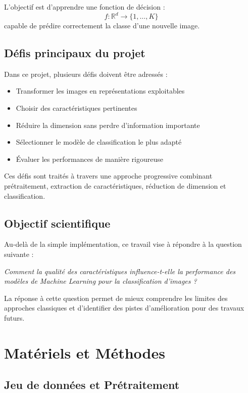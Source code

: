 \documentclass[12pt,a4paper]{article}
\begin{document}
    L’objectif est d’apprendre une fonction de décision :
    \[
    f : \mathbb{R}^d \rightarrow \{1, \dots, K\}
    \]
    capable de prédire correctement la classe d’une nouvelle image.

    \subsection{Défis principaux du projet}

    Dans ce projet, plusieurs défis doivent être adressés :
    \begin{itemize}
        \item Transformer les images en représentations exploitables
        \item Choisir des caractéristiques pertinentes
        \item Réduire la dimension sans perdre d’information importante
        \item Sélectionner le modèle de classification le plus adapté
        \item Évaluer les performances de manière rigoureuse
    \end{itemize}

    Ces défis sont traités à travers une approche progressive combinant prétraitement, extraction de caractéristiques, réduction de dimension et classification.

    \subsection{Objectif scientifique}

    Au-delà de la simple implémentation, ce travail vise à répondre à la question suivante :

    \begin{center}
    \textit{Comment la qualité des caractéristiques influence-t-elle la performance des modèles de Machine Learning pour la classification d’images ?}
    \end{center}

    La réponse à cette question permet de mieux comprendre les limites des approches classiques et d’identifier des pistes d’amélioration pour des travaux futurs.

    \section{Matériels et Méthodes}
    \subsection{Jeu de données et Prétraitement}
\end{document}
